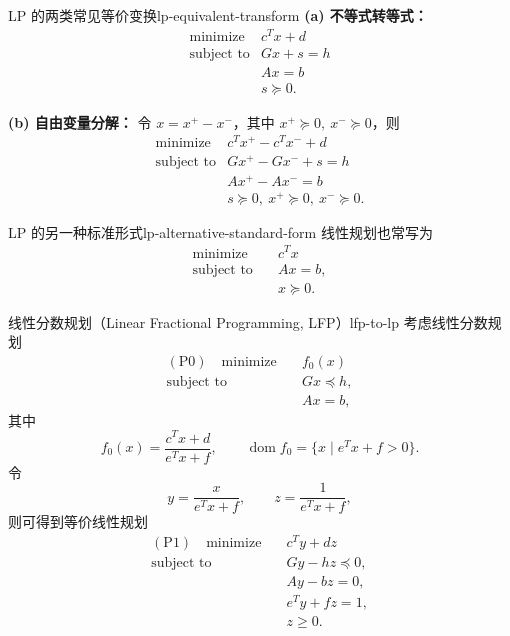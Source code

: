 \documentclass[11pt,a4paper]{article}
\begin{document}
\begin{example}{LP 的两类常见等价变换}{lp-equivalent-transform}
\textbf{(a) 不等式转等式：}
\[
\begin{array}{ll}
\text{minimize} & c^Tx+d\\
\text{subject to} & Gx+s=h\\
& Ax=b\\
& s\succeq0.
\end{array}
\]

\textbf{(b) 自由变量分解：}
令 $x=x^+-x^-$，其中 $x^+\succeq0,\ x^-\succeq0$，则
\[
\begin{array}{ll}
\text{minimize} & c^Tx^+-c^Tx^-+d\\
\text{subject to} & Gx^+-Gx^-+s=h\\
& Ax^+-Ax^-=b\\
& s\succeq0,\ x^+\succeq0,\ x^-\succeq0.
\end{array}
\]
\end{example}

\begin{definition}{LP 的另一种标准形式}{lp-alternative-standard-form}
线性规划也常写为
\[
\begin{aligned}
\text{minimize}\quad & c^Tx\\
\text{subject to}\quad & Ax=b,\\
& x\succeq0.
\end{aligned}
\]
\end{definition}

\begin{example}{线性分数规划（Linear Fractional Programming, LFP）}{lfp-to-lp}
考虑线性分数规划
\[
\begin{aligned}
(\mathrm P0)\quad
\text{minimize}\quad & f_0(x)\\
\text{subject to}\quad & Gx\preceq h,\\
& Ax=b,
\end{aligned}
\]
其中
\[
f_0(x)=\frac{c^Tx+d}{e^Tx+f},\qquad
\operatorname{dom}f_0=\{x\mid e^Tx+f>0\}.
\]
令
\[
y=\frac{x}{e^Tx+f},\qquad z=\frac{1}{e^Tx+f},
\]
则可得到等价线性规划
\[
\begin{aligned}
(\mathrm P1)\quad
\text{minimize}\quad & c^Ty+dz\\
\text{subject to}\quad & Gy-hz\preceq0,\\
& Ay-bz=0,\\
& e^Ty+fz=1,\\
& z\ge0.
\end{aligned}
\]
\end{example}
\end{document}
